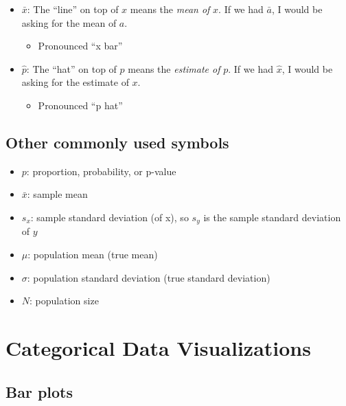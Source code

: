 \documentclass[
]{book}
\providecommand{\tightlist}{%
  \setlength{\itemsep}{0pt}\setlength{\parskip}{0pt}}
\begin{document}
\begin{itemize}
\tightlist
\item
  \(\bar x\): The ``line'' on top of \(x\) means the \emph{mean of} \(x\). If we
  had \(\bar a\), I would be asking for the mean of \(a\).

  \begin{itemize}
  \tightlist
  \item
    Pronounced ``x bar''
  \end{itemize}
\item
  \(\hat p\): The ``hat'' on top of \(p\) means the \emph{estimate of} \(p\). If we
  had \(\hat x\), I would be asking for the estimate of \(x\).

  \begin{itemize}
  \tightlist
  \item
    Pronounced ``p hat''
  \end{itemize}
\end{itemize}

\hypertarget{other-commonly-used-symbols}{%
\section{Other commonly used symbols}\label{other-commonly-used-symbols}}

\begin{itemize}
\item
  \(p\): proportion, probability, or p-value
\item
  \(\bar x\): sample mean
\item
  \(s_x\): sample standard deviation (of x), so \(s_y\) is the sample
  standard deviation of \(y\)
\item
  \(\mu\): population mean (true mean)
\item
  \(\sigma\): population standard deviation (true standard deviation)
\item
  \(N\): population size
\end{itemize}

\hypertarget{categorical-data-visualizations}{%
\chapter{Categorical Data Visualizations}\label{categorical-data-visualizations}}

\hypertarget{bar-plots}{%
\section{Bar plots}\label{bar-plots}}
\end{document}
